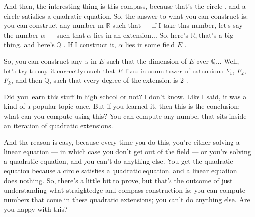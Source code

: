 \begin{speech}[00:39:59 - 00:42:25]
And then, the interesting thing is this compass, because that's the circle , and a circle satisfies a quadratic equation. So, the answer to what you can construct is: you can construct any number in $\mathbb{R}$ such that --- if I take this number, let's say the number $\alpha$ --- such that $\alpha$ lies in an extension...  So, here's $\mathbb{R}$, that's a big thing, and here's $\mathbb{Q}$ . If I construct it, $\alpha$ lies in some field $E$ .

So, you can construct any $\alpha$ in $E$ such that the dimension of $E$ over $\mathbb{Q}$... Well, let's try to say it correctly: such that $E$ lives in some tower of extensions $F_1$, $F_2$, $F_k$, and then $\mathbb{Q}$, such that every degree of the extension is $2$ .

Did you learn this stuff in high school or not? I don't know. Like I said, it was a kind of a popular topic once. But if you learned it, then this is the conclusion: what can you compute using this? You can compute any number that sits inside an iteration of quadratic extensions.

And the reason is easy, because every time you do this, you're either solving a linear equation --- in which case you don't get out of the field --- or you're solving a quadratic equation, and you can't do anything else. You get the quadratic equation because a circle satisfies a quadratic equation, and a linear equation does nothing. So, there's a little bit to prove, but that's the outcome of just understanding what straightedge and compass construction is: you can compute numbers that come in these quadratic extensions; you can't do anything else. Are you happy with this?
\end{speech}

